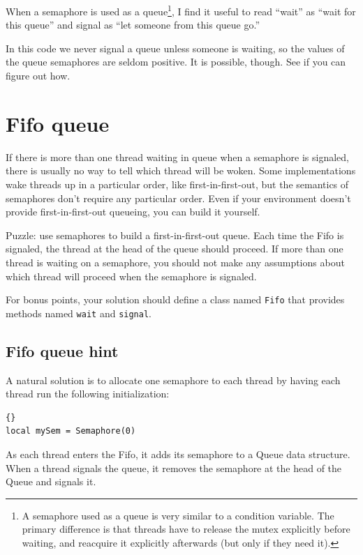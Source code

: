 \documentclass{book}
\newcommand{\clearemptydoublepage}{\newpage\cleardoublepage}
\begin{document}
When a semaphore is used as a queue\footnote{A semaphore used as a
queue is very similar to a condition variable.  The primary difference
is that threads have to release the mutex explicitly before waiting,
and reacquire it explicitly afterwards (but only if they need it).},
I find it useful to read ``wait'' as ``wait for this queue'' and
signal as ``let someone from this queue go.''

In this code we never signal a queue unless someone is waiting,
so the values of the queue semaphores are seldom positive.
It is possible, though.  See if you can figure out how.


\clearemptydoublepage
\section {Fifo queue}
\label{Fifo}

If there is more than one thread waiting in queue when a
semaphore is signaled, there is usually no way to tell which
thread will be woken.  Some implementations wake threads up
in a particular order, like first-in-first-out, but the semantics 
of semaphores don't require any particular order.
Even if your environment doesn't provide first-in-first-out
queueing, you can build it yourself.

Puzzle: use semaphores to build a first-in-first-out queue.  Each time
the Fifo is signaled, the thread at the head of the
queue should proceed.  If more than one thread is waiting on a semaphore,
you should not make any assumptions about which thread will proceed when
the semaphore is signaled.

For bonus points, your solution should define a class named
{\tt Fifo} that provides methods named {\tt wait} and {\tt signal}.


\clearemptydoublepage
\subsection {Fifo queue hint}

A natural solution is to allocate one semaphore to each thread
by having each thread run the following initialization:

\begin{lstlisting}[caption={Thread initialization}]{}
local mySem = Semaphore(0)
\end{lstlisting}

As each thread enters the Fifo, it adds its semaphore to a Queue
data structure.  When a thread signals the queue, it removes
the semaphore at the head of the Queue and signals it.
\end{document}
